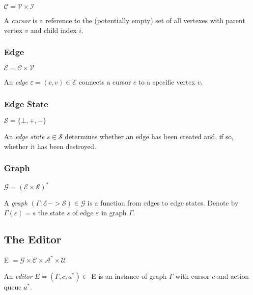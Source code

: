 \documentclass[letterpaper,12pt]{article}
\def\A{\mathcal{A}}
\def\C{\mathcal{C}}
\def\E{\mathcal{E}}
\def\G{\mathcal{G}}
\def\I{\mathcal{I}}
\def\S{\mathcal{S}}
\def\U{\mathcal{U}}
\def\V{\mathcal{V}}
\def\e{\varepsilon}
\begin{document}
$\C = \V \times \I$

A \emph{cursor} is a reference to the (potentially empty) set of all vertexes
with parent vertex $v$ and child index $i$.


\subsubsection{Edge}
\label{sec:edge}

$\E = \C \times \V$

An \emph{edge} $\e = (c, v) \in \E$ connects a cursor $c$ to a specific vertex
$v$.


\subsubsection{Edge State}
\label{sec:edge-state}

$\S = \{\bot,+,-\}$

An \emph{edge state} $s \in \S$ determines whether an edge has been created
and, if so, whether it has been destroyed.


\subsubsection{Graph}
\label{sec:graph}

$\G = (\E \times \S)^{*}$

A \emph{graph} $(\Gamma : \E -> \S) \in \G$ is a function from edges to edge
states. Denote by $\Gamma(\e) = s$ the state $s$ of edge $\e$ in graph
$\Gamma$.


\subsection{The Editor}
\label{sec:the-editor}

E $= \G \times \C \times \A^{*} \times \U$

An \emph{editor} $E = (\Gamma,c,a^{*}) \in$ E is an instance of graph $\Gamma$
with cursor $c$ and action queue $a^{*}$.
\end{document}
